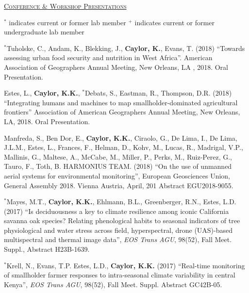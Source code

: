 \documentclass[10pt]{report}
\begin{document}
\newpage
\vspace*{.1in}
\textsc{\underline{Conference \& Workshop Presentations}}

{ \small $^{*}$ indicates current or former lab member}
{ \small $^{+}$ indicates current or former undergraduate lab member}

\vspace*{.1in}

\begin{etaremune}

\item $^{*}$Tuholske, C., Andam, K., Blekking, J., \textbf{Caylor, K.}, Evans, T. (2018) ``Towards assessing urban food security and nutrition in West Africa''. American Association of Geographers Annual Meeting, New Orleans, LA , 2018. Oral Presentation.

\item Estes, L., \textbf{Caylor, K.K.}, $^{*}$Debats, S., Eastman, R., Thompson, D.R. (2018) ``Integrating humans and machines to map smallholder-dominated agricultural frontiers'' Association of American Geographers Annual Meeting, New Orleans, LA, 2018. Oral Presentation. 

\item Manfreda, S., Ben Dor, E., \textbf{Caylor, K.K.}, Ciraolo, G., De Lima, I., De Lima, J.L.M., Estes, L., Frances, F., Helman, D., Kohv, M., Lucas, R., Madrigal, V.P., Mallinis, G., Maltese, A., McCabe, M., Miller, P., Perks, M., Ruiz-Perez, G., Tauro, F., Toth, B. HARMONIUS TEAM. (2018) ``On the use of unmanned aerial systems for environmental monitoring'', European Geosciences Union, General Assembly 2018. Vienna Austria, April, 201 Abstract EGU2018-9055. 

\item $^{*}$Mayes, M.T., \textbf{Caylor, K.K.}, Ehlmann, B.L., Greenberger, R.N., Estes, L.D. (2017) ``Is deciduousness a key to climate resilience among iconic California savanna oak species? Relating phenological habits to seasonal indicators of tree physiological and water stress across field, hyperspectral, drone (UAS)-based multispectral and thermal image data'', \emph{EOS Trans AGU}, 98(52), Fall Meet. Suppl., Abstract H23B-1639.

\item $^{*}$Krell, N., Evans, T.P. Estes, L.D., \textbf{Caylor, K.K.} (2017) ``Real-time monitoring of smallholder farmer responses to intra-seasonal climate variability in central Kenya'', \emph{EOS Trans AGU}, 98(52), Fall Meet. Suppl. Abstract GC42B-05.


\end{etaremune}
\end{document}
